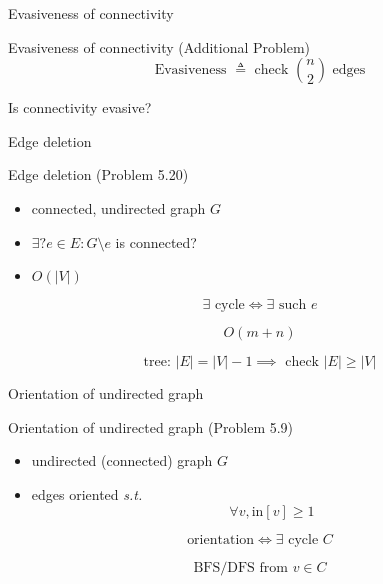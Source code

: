\begin{frame}{Evasiveness of connectivity}
  \begin{exampleblock}{Evasiveness of connectivity (Additional Problem)}
	\[
	  \text{Evasiveness } \triangleq \text{ check } \binom{n}{2} \text{ edges}
	\]

	\centerline{Is connectivity evasive?}
  \end{exampleblock}

  \pause
  \vspace{0.50cm}
\end{frame}
\begin{frame}{Edge deletion}
  \begin{exampleblock}{Edge deletion (Problem 5.20)}
    \begin{itemize}
      \item connected, undirected graph $G$
      \item $\exists? e \in E: G \setminus e$ is connected?
      \item $O(|V|)$
    \end{itemize}
  \end{exampleblock}

  \pause
  \[
	\exists \text{ cycle} \iff \exists \text{ such } e
  \]

  \pause
  \[
	O(m + n)
  \]

  \pause
  \[
	\text{tree: } |E| = |V| - 1 \implies \text{ check } |E| \ge |V|
  \]
\end{frame}
\begin{frame}{Orientation of undirected graph}
  \begin{exampleblock}{Orientation of undirected graph (Problem 5.9)}
	\begin{itemize}
      \item undirected (connected) graph $G$ 
	  \item edges oriented \emph{s.t.} 
		\[
		  \forall v, \text{in}[v] \ge 1
		\]
	\end{itemize}
  \end{exampleblock}

  \pause
  \[
	\text{orientation} \iff \exists \text{ cycle } C
  \]

  \pause
  \[
	\text{BFS/DFS from } v \in C
  \]
\end{frame}
